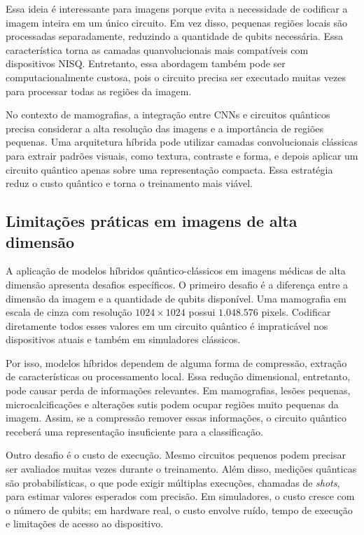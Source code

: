 \documentclass[
    12pt,
    openright,
    oneside,
    a4paper,
    english,
    brazil
]{abntex2}
\begin{document}
Essa ideia é interessante para imagens porque evita a necessidade de codificar a imagem inteira em um único circuito. Em vez disso, pequenas regiões locais são processadas separadamente, reduzindo a quantidade de qubits necessária. Essa característica torna as camadas quanvolucionais mais compatíveis com dispositivos NISQ. Entretanto, essa abordagem também pode ser computacionalmente custosa, pois o circuito precisa ser executado muitas vezes para processar todas as regiões da imagem.

No contexto de mamografias, a integração entre CNNs e circuitos quânticos precisa considerar a alta resolução das imagens e a importância de regiões pequenas. Uma arquitetura híbrida pode utilizar camadas convolucionais clássicas para extrair padrões visuais, como textura, contraste e forma, e depois aplicar um circuito quântico apenas sobre uma representação compacta. Essa estratégia reduz o custo quântico e torna o treinamento mais viável.

\subsection{Limitações práticas em imagens de alta dimensão}

A aplicação de modelos híbridos quântico-clássicos em imagens médicas de alta dimensão apresenta desafios específicos. O primeiro desafio é a diferença entre a dimensão da imagem e a quantidade de qubits disponível. Uma mamografia em escala de cinza com resolução \(1024 \times 1024\) possui \(1.048.576\) pixels. Codificar diretamente todos esses valores em um circuito quântico é impraticável nos dispositivos atuais e também em simuladores clássicos.

Por isso, modelos híbridos dependem de alguma forma de compressão, extração de características ou processamento local. Essa redução dimensional, entretanto, pode causar perda de informações relevantes. Em mamografias, lesões pequenas, microcalcificações e alterações sutis podem ocupar regiões muito pequenas da imagem. Assim, se a compressão remover essas informações, o circuito quântico receberá uma representação insuficiente para a classificação.

Outro desafio é o custo de execução. Mesmo circuitos pequenos podem precisar ser avaliados muitas vezes durante o treinamento. Além disso, medições quânticas são probabilísticas, o que pode exigir múltiplas execuções, chamadas de \textit{shots}, para estimar valores esperados com precisão. Em simuladores, o custo cresce com o número de qubits; em hardware real, o custo envolve ruído, tempo de execução e limitações de acesso ao dispositivo.
\end{document}
